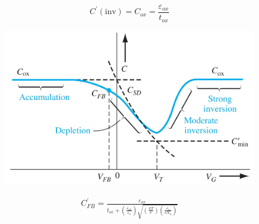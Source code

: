 \documentclass[a4paper, twocolumn]{article}
\begin{document}
    \begin{equation*}
        C^\prime (\text{inv}) = C_{ox} = \frac{\varepsilon_{ox} }{t_{ox}}
    \end{equation*}
    \begin{figure}[H]
        \centering
        \includegraphics[width=0.8\linewidth]{C-V-graph-low-frequency.jpg}
        \label{fig:C-V-graph-low-frequency.jpg}
    \end{figure}
    \begin{equation*}
        \begin{aligned}
            C^\prime_{FB} = \frac{\varepsilon_{ox} }{t_{ox} + \left( \frac{\varepsilon_{ox} }{\varepsilon_s}  \right) \sqrt{\left( \frac{kT}{e}  \right) \left( \frac{\varepsilon_s}{eN_a}  \right)}} 
        \end{aligned}
    \end{equation*}
\end{document}
